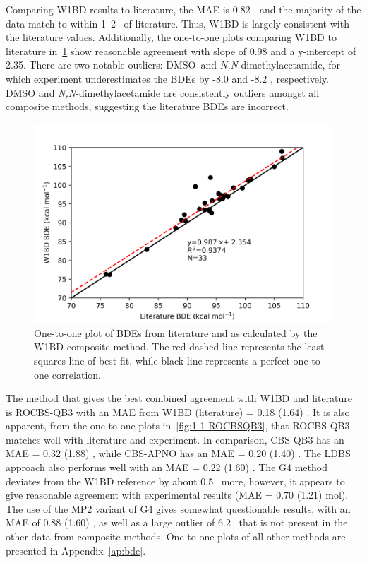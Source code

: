 \begin{doublespace}
Comparing W1BD results to literature, the MAE is 0.82 \kcalmol, and the majority
of the data match to within 1--2 \kcalmol\ of literature. Thus, W1BD is largely
consistent with the literature values. Additionally, the one-to-one plots
comparing W1BD to literature in~\ref{fig:1-1-W1BD} show reasonable agreement
with slope of 0.98 and a y-intercept of 2.35. There are two notable outliers:
DMSO\footnotemark\ and \emph{N,N}-dimethylacetamide, for which experiment
underestimates the BDEs by -8.0 and -8.2 \kcalmol, respectively. DMSO and
\emph{N,N}-dimethylacetamide are consistently outliers amongst all composite
methods, suggesting the literature BDEs are incorrect.


\begin{figure}[H]
  \centering
  \includegraphics[width=\textwidth]{figures/lit-w1bd}
  \caption[One-to-one plot of BDEs from literature and as calculated by the
  W1BD composite method.]{One-to-one plot of BDEs from
  literature\protect\cite{Luo2002} and as calculated by the W1BD composite
  method. The red dashed-line represents the least squares line of best fit,
  while black line represents a perfect one-to-one correlation.}
  \label{fig:1-1-W1BD}
\end{figure}

The method that gives the best combined agreement with W1BD and literature is
ROCBS-QB3 with an MAE from W1BD (literature) = 0.18 (1.64) \kcalmol. It is also
apparent, from the one-to-one plots in~\ref{fig:1-1-ROCBSQB3}, that ROCBS-QB3
matches well with literature and experiment. In comparison, CBS-QB3 has an MAE =
0.32 (1.88) \kcalmol, while CBS-APNO has an MAE = 0.20 (1.40) \kcalmol. The LDBS
approach also performs well with an MAE = 0.22 (1.60) \kcalmol. The G4 method
deviates from the W1BD reference by about 0.5 \kcalmol\ more, however, it
appears to give reasonable agreement with experimental results (MAE = 0.70
(1.21) mol). The use of the MP2 variant of G4 gives somewhat questionable
results, with an MAE of 0.88 (1.60) \kcalmol, as well as a large outlier of 6.2
\kcalmol\ that is not present in the other data from composite methods.
One-to-one plots of all other methods are presented in Appendix~\ref{ap:bde}.


\end{doublespace}
